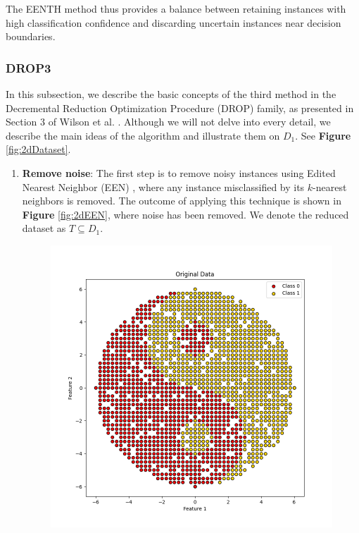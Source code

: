 The EENTH method thus provides a balance between retaining instances with high classification confidence and discarding uncertain instances near decision boundaries.

\subsubsection{DROP3}
In this subsection, we describe the basic concepts of the third method in the Decremental Reduction Optimization Procedure (DROP) family, as presented in Section 3 of Wilson et al. \cite{wilson2000reduction}. Although we will not delve into every detail, we describe the main ideas of the algorithm and illustrate them on $D_1$. See \textbf{Figure} \ref{fig:2dDataset}.

\begin{enumerate}
	\item \textbf{Remove noise}: The first step is to remove noisy instances using Edited Nearest Neighbor (EEN) \cite{wilson1972asymptotic}, where any instance misclassified by its $ k $-nearest neighbors is removed. The outcome of applying this technique is shown in \textbf{Figure} \ref{fig:2dEEN}, where noise has been removed. We denote the reduced dataset as $ T \subseteq D_1 $.
	\begin{figure}[ht]
		\centering
		\begin{minipage}{0.45\textwidth}
			\centering
			\includegraphics[width=\textwidth]{figures/2dDataset} %

\end{minipage}
\end{figure}
\end{enumerate}
